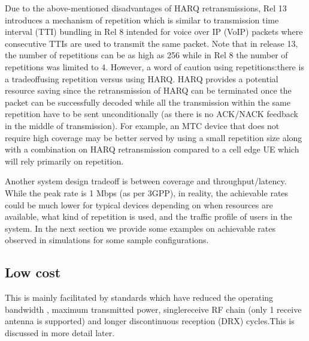 \documentclass[conference,compsoc]{IEEEtran}
\begin{document}
Due to the above-mentioned disadvantages of HARQ retransmissions, Rel 13 introduces a mechanism of repetition which is similar to transmission time interval (TTI) bundling in Rel 8 intended for voice over IP (VoIP) packets where consecutive TTIs are used to transmit the same packet. Note that in release 13, the number of repetitions can be as high as 256 while in Rel 8 the number of repetitions was limited to 4. However, a word of caution using repetitions:there is a tradeoffusing repetition versus using HARQ. HARQ provides a potential resource saving since the retransmission of HARQ can be terminated once the packet can be successfully decoded while all the transmission within the same repetition have to be sent unconditionally (as there is no ACK/NACK feedback in the middle of transmission). For example, an MTC device that does not require high coverage may be better served by using a small repetition size along with a combination on HARQ retransmission compared to a cell edge UE which will rely primarily on repetition. 

Another system design tradeoff is between coverage and throughput/latency. While the peak rate is 1 Mbps (as per 3GPP), in reality, the achievable rates could be much lower for typical devices depending on when resources are available, what kind of repetition is used, and the traffic profile of users in the system. In the next section we provide some examples on achievable rates observed in simulations for some sample configurations.

\subsection{Low cost}
This is mainly facilitated by standards which have reduced the operating bandwidth , maximum transmitted power, singlereceive RF chain (only 1 receive antenna is supported) and longer discontinuous reception (DRX) cycles.This is discussed in more detail later.
\end{document}
